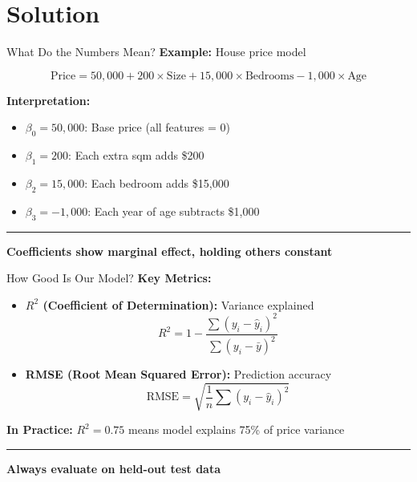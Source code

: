 \documentclass[8pt,aspectratio=169]{beamer}
\newcommand{\bottomnote}[1]{%
\vfill
\vspace{-2mm}
\textcolor{mllavender2}{\rule{\textwidth}{0.4pt}}
\vspace{1mm}
\footnotesize
\textbf{#1}
}
\begin{document}
\section{Solution}

\begin{frame}[t]{What Do the Numbers Mean?}
\textbf{Example:} House price model

\vspace{0.3em}
\begin{equation}
  \text{Price} = 50{,}000 + 200 \times \text{Size} + 15{,}000 \times \text{Bedrooms} - 1{,}000 \times \text{Age}
\end{equation}

\textbf{Interpretation:}
\begin{itemize}
  \item $\beta_0 = 50{,}000$: Base price (all features = 0)
  \item $\beta_1 = 200$: Each extra sqm adds \$200
  \item $\beta_2 = 15{,}000$: Each bedroom adds \$15,000
  \item $\beta_3 = -1{,}000$: Each year of age subtracts \$1,000
\end{itemize}

\bottomnote{Coefficients show marginal effect, holding others constant}
\end{frame}

\begin{frame}[t]{How Good Is Our Model?}
\textbf{Key Metrics:}

\begin{itemize}
  \item \textbf{$R^2$ (Coefficient of Determination):} Variance explained
  \begin{equation}
    R^2 = 1 - \frac{\sum(y_i - \hat{y}_i)^2}{\sum(y_i - \bar{y})^2}
  \end{equation}

  \item \textbf{RMSE (Root Mean Squared Error):} Prediction accuracy
  \begin{equation}
    \text{RMSE} = \sqrt{\frac{1}{n}\sum(y_i - \hat{y}_i)^2}
  \end{equation}
\end{itemize}

\vspace{0.3em}
\textbf{In Practice:} $R^2 = 0.75$ means model explains 75\% of price variance

\bottomnote{Always evaluate on held-out test data}
\end{frame}
\end{document}
